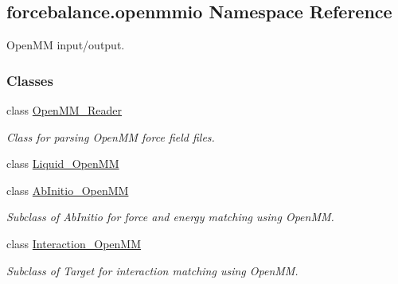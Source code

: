\hypertarget{namespaceforcebalance_1_1openmmio}{\subsection{forcebalance.\-openmmio Namespace Reference}
\label{namespaceforcebalance_1_1openmmio}
}


Open\-M\-M input/output.  


\subsubsection*{Classes}
\begin{DoxyCompactItemize}
\item 
class \hyperlink{classforcebalance_1_1openmmio_1_1OpenMM__Reader}{Open\-M\-M\-\_\-\-Reader}
\begin{DoxyCompactList}\small\item\em Class for parsing Open\-M\-M force field files. \end{DoxyCompactList}\item 
class \hyperlink{classforcebalance_1_1openmmio_1_1Liquid__OpenMM}{Liquid\-\_\-\-Open\-M\-M}
\item 
class \hyperlink{classforcebalance_1_1openmmio_1_1AbInitio__OpenMM}{Ab\-Initio\-\_\-\-Open\-M\-M}
\begin{DoxyCompactList}\small\item\em Subclass of Ab\-Initio for force and energy matching using Open\-M\-M. \end{DoxyCompactList}\item 
class \hyperlink{classforcebalance_1_1openmmio_1_1Interaction__OpenMM}{Interaction\-\_\-\-Open\-M\-M}
\begin{DoxyCompactList}\small\item\em Subclass of Target for interaction matching using Open\-M\-M. \end{DoxyCompactList}\end{DoxyCompactItemize}
